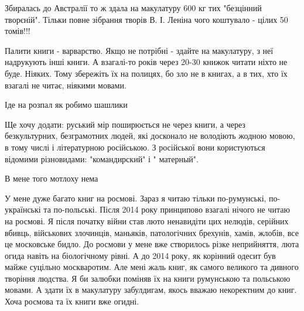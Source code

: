 \begin{itemize}
Збиралась до Австралії то ж здала на макулатуру 600 кг тих "безцінний
творєній". Тільки повне зібрання творів В. І. Леніна чого коштувало - цілих 50
томів!!!

 

Палити книги - варварство. Якщо не потрібні - здайте на макулатуру, з неї
надрукують інші книги. А взагалі-то років через 20-30 книжок читати ніхто не
буде. Ніяких. Тому збережіть їх на полицях, бо зло не в книгах, а в тих, хто їх
взагалі не читає, ніякими мовами.


 
Іде на розпал як робимо шашлики

 

Ще хочу додати: руський мір поширюється не через книги, а через безкультурних,
безграмотних людей, які досконало не володіють жодною мовою, в тому числі і
літературною російською. З російської вони користуються відомими різновидами:
"командирский" і " матерный".


 
В мене того мотлоху нема

 

У мене дуже багато книг на росмові. Зараз я читаю тільки по-румунські,
по-українські та по-польські. Після 2014 року принципово взагалі нічого не
читаю на росмові. Я після початку війни став люто ненавидіти цих нелюдів,
серійних вбивць, військових злочинців, маньяків, патологічних брехунів, хамів,
жлобів, все це московське бидло. До росмови у мене вже створилось різке
неприйняття, люта огида навіть на біологічному рівні. А до 2014 року, як
корінний одесит був майже суцільно москваротим. Але мені жаль книг, як самого
великого та дивного творіння людства. Я би залюбки поміняв їх на книги
румунською та польською мовами. А здати їх в макулатуру забулдигам, якось
вважаю некоректним до книг. Хоча росмова та їх книги вже огидні.



\end{itemize}
